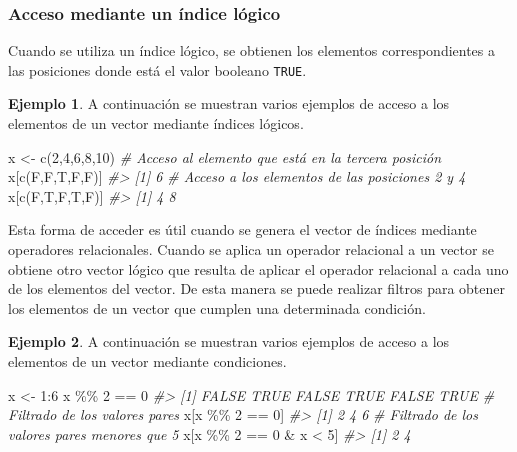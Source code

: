\documentclass[
]{book}
\newenvironment{Shaded}{\begin{snugshade}}{\end{snugshade}}
\newcommand{\CommentTok}[1]{\textcolor[rgb]{0.56,0.35,0.01}{\textit{#1}}}
\newcommand{\DecValTok}[1]{\textcolor[rgb]{0.00,0.00,0.81}{#1}}
\newcommand{\FunctionTok}[1]{\textcolor[rgb]{0.00,0.00,0.00}{#1}}
\newcommand{\NormalTok}[1]{#1}
\newcommand{\OtherTok}[1]{\textcolor[rgb]{0.56,0.35,0.01}{#1}}
\newcommand{\SpecialCharTok}[1]{\textcolor[rgb]{0.00,0.00,0.00}{#1}}
\theoremstyle{definition}
\theoremstyle{definition}
\newtheorem{example}{Ejemplo}[chapter]
\theoremstyle{definition}
\theoremstyle{definition}
\theoremstyle{remark}
\begin{document}
\hypertarget{acceso-mediante-un-uxedndice-luxf3gico}{%
\subsubsection{Acceso mediante un índice lógico}\label{acceso-mediante-un-uxedndice-luxf3gico}}

Cuando se utiliza un índice lógico, se obtienen los elementos correspondientes a las posiciones donde está el valor booleano \texttt{TRUE}.

\begin{example}

A continuación se muestran varios ejemplos de acceso a los elementos de un vector mediante índices lógicos.

\begin{Shaded}
\begin{Highlighting}[]
\NormalTok{x }\OtherTok{\textless{}{-}} \FunctionTok{c}\NormalTok{(}\DecValTok{2}\NormalTok{,}\DecValTok{4}\NormalTok{,}\DecValTok{6}\NormalTok{,}\DecValTok{8}\NormalTok{,}\DecValTok{10}\NormalTok{)}
\CommentTok{\# Acceso al elemento que está en la tercera posición}
\NormalTok{x[}\FunctionTok{c}\NormalTok{(F,F,T,F,F)]}
\CommentTok{\#\textgreater{} [1] 6}
\CommentTok{\# Acceso a los elementos de las posiciones 2 y 4}
\NormalTok{x[}\FunctionTok{c}\NormalTok{(F,T,F,T,F)]}
\CommentTok{\#\textgreater{} [1] 4 8}
\end{Highlighting}
\end{Shaded}

\end{example}

Esta forma de acceder es útil cuando se genera el vector de índices mediante operadores relacionales. Cuando se aplica un operador relacional a un vector se obtiene otro vector lógico que resulta de aplicar el operador relacional a cada uno de los elementos del vector. De esta manera se puede realizar filtros para obtener los elementos de un vector que cumplen una determinada condición.

\begin{example}

A continuación se muestran varios ejemplos de acceso a los elementos de un vector mediante condiciones.

\begin{Shaded}
\begin{Highlighting}[]
\NormalTok{x }\OtherTok{\textless{}{-}} \DecValTok{1}\SpecialCharTok{:}\DecValTok{6}
\NormalTok{x }\SpecialCharTok{\%\%} \DecValTok{2} \SpecialCharTok{==} \DecValTok{0}
\CommentTok{\#\textgreater{} [1] FALSE  TRUE FALSE  TRUE FALSE  TRUE}
\CommentTok{\# Filtrado de los valores pares}
\NormalTok{x[x }\SpecialCharTok{\%\%} \DecValTok{2} \SpecialCharTok{==} \DecValTok{0}\NormalTok{]}
\CommentTok{\#\textgreater{} [1] 2 4 6}
\CommentTok{\# Filtrado de los valores pares menores que 5}
\NormalTok{x[x }\SpecialCharTok{\%\%} \DecValTok{2} \SpecialCharTok{==} \DecValTok{0} \SpecialCharTok{\&}\NormalTok{ x }\SpecialCharTok{\textless{}} \DecValTok{5}\NormalTok{]}
\CommentTok{\#\textgreater{} [1] 2 4}
\end{Highlighting}
\end{Shaded}

\end{example}
\end{document}
